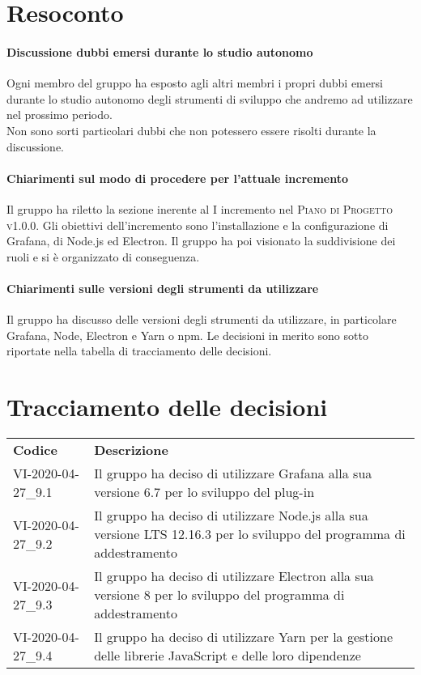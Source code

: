\documentclass{article}
\begin{document}
\section{Resoconto}%
\label{resoconto}
\paragraph*{Discussione dubbi emersi durante lo studio autonomo}
Ogni membro del gruppo ha esposto agli altri membri i propri dubbi emersi durante lo studio autonomo degli strumenti di sviluppo che andremo ad utilizzare nel prossimo periodo. \\
Non sono sorti particolari dubbi che non potessero essere risolti durante la discussione.

\paragraph*{Chiarimenti sul modo di procedere per l'attuale incremento}
Il gruppo ha riletto la sezione inerente al I incremento nel \textsc{Piano di Progetto v1.0.0}. Gli obiettivi dell'incremento sono l'installazione e la configurazione di Grafana, di Node.js ed Electron. Il gruppo ha poi visionato la suddivisione dei ruoli e si è organizzato di conseguenza.

\paragraph*{Chiarimenti sulle versioni degli strumenti da utilizzare}
Il gruppo ha discusso delle versioni degli strumenti da utilizzare, in particolare Grafana, Node, Electron e Yarn o npm. Le decisioni in merito sono sotto riportate nella tabella di tracciamento delle decisioni.

\section{Tracciamento delle decisioni}
\begin{table}[H]
  \centering
  \begin{tabular}{p{4cm}|p{12cm}}
    \rowcolor{lightgray}
    \textbf{Codice}  & \textbf{Descrizione}      \\
     VI-2020-04-27\_9.1 & Il gruppo ha deciso di utilizzare Grafana alla sua versione 6.7 per lo sviluppo del plug-in \\
     VI-2020-04-27\_9.2 & Il gruppo ha deciso di utilizzare Node.js alla sua versione LTS 12.16.3 per lo sviluppo del programma di addestramento \\
     VI-2020-04-27\_9.3 & Il gruppo ha deciso di utilizzare Electron alla sua versione 8 per lo sviluppo del programma di addestramento \\
     VI-2020-04-27\_9.4 & Il gruppo ha deciso di utilizzare Yarn per la gestione delle librerie JavaScript e delle loro dipendenze \\
  \end{tabular}
\end{table}
\end{document}
